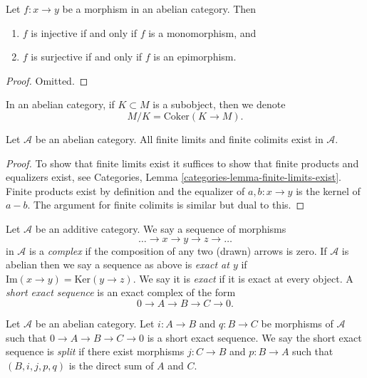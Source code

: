 \begin{lemma}
\label{lemma-characterize-injective}
Let $f : x \to y$ be a morphism in an abelian category. Then
\begin{enumerate}
\item $f$ is injective if and only if $f$ is a monomorphism, and
\item $f$ is surjective if and only if $f$ is an epimorphism.
\end{enumerate}
\end{lemma}

\begin{proof}
Omitted.
\end{proof}

\noindent
In an abelian category, if $K \subset M$ is a subobject,
then we denote
$$
M/K = \text{Coker}(K \to M).
$$

\begin{lemma}
\label{lemma-colimit-abelian-category}
Let $\mathcal{A}$ be an abelian category.
All finite limits and finite colimits exist in $\mathcal{A}$.
\end{lemma}

\begin{proof}
To show that finite limits exist it suffices to show
that finite products and equalizers exist, see
Categories, Lemma \ref{categories-lemma-finite-limits-exist}.
Finite products exist
by definition and the equalizer of $a, b : x \to y$ is
the kernel of $a - b$. The argument for finite colimits
is similar but dual to this.
\end{proof}

\begin{definition}
\label{definition-exact}
Let $\mathcal{A}$ be an additive category.
We say a sequence of morphisms
$$
\ldots \to x \to y \to z \to \ldots
$$
in $\mathcal{A}$
is a {\it complex} if the composition of any two (drawn)
arrows is zero. If $\mathcal{A}$ is abelian then
we say a sequence as above is {\it exact at $y$} if
$\text{Im}(x \to y) = \text{Ker}(y \to z)$. We say it is {\it exact}
if it is exact at every object. A {\it short exact sequence}
is an exact complex of the form
$$
0 \to A  \to B \to C \to 0.
$$
\end{definition}

\begin{definition}
\label{definition-ses-split}
Let $\mathcal{A}$ be an abelian category.
Let $i : A \to B$ and $q : B \to C$ be morphisms
of $\mathcal{A}$ such that
$0 \to A \to B \to C \to 0$ is a short
exact sequence. We say the short exact
sequence is {\it split} if there exist
morphisms $j : C \to B$ and $p : B \to A$ such
that $(B, i, j, p, q)$ is the direct sum of $A$ and $C$.
\end{definition}

